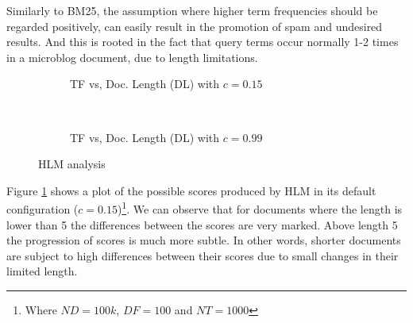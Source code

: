 Similarly to BM25, the assumption where higher term frequencies should be regarded positively, can easily result in the promotion of spam and undesired results. And this is rooted in the fact that query terms occur normally 1-2 times in a microblog document, due to length limitations.

%         

%	

\begin{figure}[]
     \begin{subfigure}[b]{0.5\textwidth}
      \centering
      \caption{TF vs, Doc. Length (DL)  with $c = 0.15$}
       
       	\label{cTFVSDL15}
    \end{subfigure}  
      ~
     \begin{subfigure}[b]{0.5\textwidth}
      \centering
      \caption{TF vs, Doc. Length (DL)  with $c = 0.99$}
       
       \label{cTFVSDL99}
    \end{subfigure}  
    \caption{HLM analysis}
	\label{cTFVSDL}
\end{figure}

Figure \ref{cTFVSDL15} shows a plot of the possible scores produced by HLM in its default configuration (\(c=0.15\))\footnote{Where \(ND=100k\), \(DF=100\) and \(NT=1000\)}. We can observe that for documents where the length is lower than 5 the differences between the scores are very marked. Above length 5 the progression of scores is much more subtle. In other words, shorter documents are subject to high differences between their scores due to small changes in their limited length.

